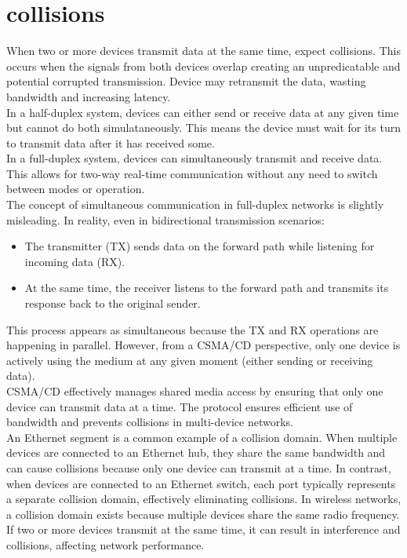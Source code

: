 \documentclass[parindent=0pt]{article}
\begin{document}
\section*{collisions}
When two or more devices transmit data at the same time, expect collisions. This occurs when the signals from both devices overlap creating an unpredicatable and potential corrupted transmission. Device may retransmit the data, wasting bandwidth and increasing latency.\\ 

In a half-duplex system, devices can either send or receive data at any given time but cannot do both simulataneously. This means the device must wait for its turn to transmit data after it has received some.\\

In a full-duplex system, devices can simultaneously transmit and receive data. This allows for two-way real-time communication without any need to switch between modes or operation.\\

The concept of simultaneous communication in full-duplex networks is slightly misleading. In reality, even in bidirectional transmission scenarios:
	\begin{itemize}
		\item The transmitter (TX) sends data on the forward path while listening for incoming data (RX).
		\item At the same time, the receiver listens to the forward path and transmits its response back to the original sender.
	\end{itemize}

This process appears as simultaneous because the TX and RX operations are happening in parallel. However, from a CSMA/CD perspective, only one device is actively using the medium at any given moment (either sending or receiving data).\\

CSMA/CD effectively manages shared media access by ensuring that only one device can transmit data at a time. The protocol ensures efficient use of bandwidth and prevents collisions in multi-device networks.\\

An Ethernet segment is a common example of a collision domain. When multiple devices are connected to an Ethernet hub, they share the same bandwidth and can cause collisions because only one device can transmit at a time. In contrast, when devices are connected to an Ethernet switch, each port typically represents a separate collision domain, effectively eliminating collisions. In wireless networks, a collision domain exists because multiple devices share the same radio frequency. If two or more devices transmit at the same time, it can result in interference and collisions, affecting network performance.\\
\end{document}
